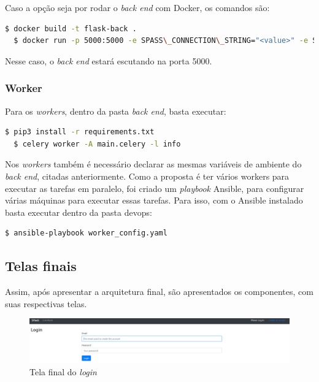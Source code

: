 \documentclass[11pt,twoside]{article}
\begin{document}
Caso a opção seja por rodar o \emph{back end} com Docker, os comandos são:

\begin{lstlisting}[language=bash]
  $ docker build -t flask-back .
  $ docker run -p 5000:5000 -e SPASS\_CONNECTION\_STRING="<value>" -e SPASS\_DATA\_BLOB\_KEY="<value>" -e SPASS\_CELERY\_BROKER="<value>" flask-back
\end{lstlisting}

Nesse caso, o \emph{back end} estará escutando na porta 5000.

\subsubsection{Worker}

Para os \emph{workers}, dentro da pasta \emph{back end}, basta executar:

\begin{lstlisting}[language=bash]
  $ pip3 install -r requirements.txt
  $ celery worker -A main.celery -l info
\end{lstlisting}

Nos \emph{workers} também é necessário declarar as mesmas variáveis de ambiente do \emph{back end}, citadas anteriormente. 
Como a proposta é ter vários workers para executar as tarefas em paralelo, foi criado um \emph{playbook} Ansible, para configurar várias máquinas para 
executar essas tarefas. Para isso, com o Ansible instalado basta executar dentro da pasta devops:

\begin{lstlisting}[language=bash]
  $ ansible-playbook worker_config.yaml
\end{lstlisting}

\subsection{Telas finais}

Assim, após apresentar a arquitetura final, são apresentados os componentes, com suas respectivas telas. 

\begin{figure}[!h]
  \centering
  \includegraphics[scale=0.3]{final_login.eps}
  \caption{Tela final do \emph{login}}
  \label{fig:finalLogin}
\end{figure}
\end{document}
